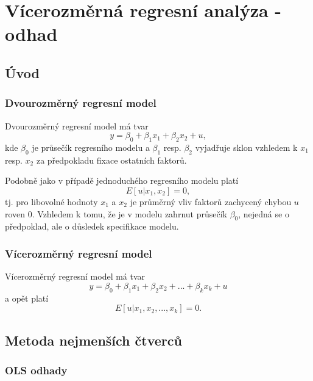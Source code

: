\chapter{Vícerozměrná regresní analýza - odhad}

\section{Úvod}

\subsection{Dvourozměrný regresní model}

Dvourozměrný regresní model má tvar
\begin{equation}
y = \beta_0 + \beta_1 x_1 + \beta_2 x_2 + u,
\end{equation}
kde $\beta_0$ je průsečík regresního modelu a $\beta_1$ resp. $\beta_2$ vyjadřuje sklon vzhledem k $x_1$ resp. $x_2$ za předpokladu fixace ostatních faktorů.

Podobně jako v případě jednoduchého regresního modelu platí
\begin{equation}
E[u|x_1, x_2] = 0,
\end{equation}
tj. pro libovolné hodnoty $x_1$ a $x_2$ je průměrný vliv faktorů zachycený chybou $u$ roven 0. Vzhledem k tomu, že je v 
modelu zahrnut průsečík $\beta_0$, nejedná se o předpoklad, ale o důsledek specifikace modelu.

\subsection{Vícerozměrný regresní model}

Vícerozměrný regresní model má tvar
\begin{equation}
y = \beta_0 + \beta_1 x_1 + \beta_2 x_2 + ... + \beta_k x_k + u
\end{equation}
a opět platí
\begin{equation}
E[u|x_1, x_2, ..., x_k] = 0.
\end{equation}

\section{Metoda nejmenších čtverců}

\subsection{OLS odhady}


